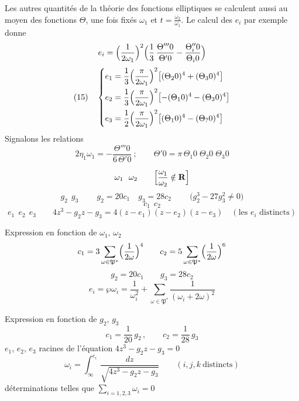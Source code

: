 \documentclass[11pt,a4paper]{article}
\begin{document}
Les autres quantités de la théorie des fonctions elliptiques se calculent
aussi au moyen des fonctions $\Theta$, une fois fixés $\omega_1$ et
$t = \frac{\omega_2}{\omega_1}$. Le calcul des $e_i$ par exemple donne
\[
e_i = \Bigl(\frac{1}{2\omega_1}\Bigr)^2\Bigl(\frac{1}{3}\,\frac{\Theta'''0}{\Theta'0}
- \frac{\Theta''_i 0}{\Theta_i 0}\Bigr)
\]
\ill{} \ill{}
\[
(15)\quad \left\lbrace
\begin{aligned}
e_1 &= \frac13\Bigl(\frac{\pi}{2\omega_1}\Bigr)^2\bigl[(\Theta_2 0)^4 + (\Theta_3 0)^4\bigr]\\
e_2 &= \frac13\Bigl(\frac{\pi}{2\omega_1}\Bigr)^2\bigl[-(\Theta_1 0)^4 - (\Theta_3 0)^4\bigr]\\
e_3 &= \frac12\Bigl(\frac{\pi}{2\omega_1}\Bigr)^2\bigl[(\Theta_1 0)^4 - (\Theta_? 0)^4\bigr]
\end{aligned}
\right.
\]
Signalons les relations
\[
2\eta_1\omega_1 = -\frac{\Theta'''0}{6\,\Theta'0}\ ; \qquad
\Theta'0 = \pi\,\Theta_1 0\;\Theta_2 0\;\Theta_3 0
\]

\[
\omega_1\ \ \omega_2 \qquad \Bigl[\frac{\omega_1}{\omega_2}\notin\mathbf{R}\Bigr]
\]
\[
g_2\ \ g_3 \qquad \boxed{\ g_2 = 20c_1 \quad g_3 = 28c_2\ } \qquad
\bigl(g_2^3 - 27g_3^2 \neq 0\bigr)
\]
\[
c_1\ \ c_2
\]
\[
e_1\ \ e_2\ \ e_3 \qquad 4z^3 - g_2 z - g_3 = 4(z-e_1)(z-e_2)(z-e_3)
\quad (\text{les } e_i \text{ distincts})
\]

Expression en fonction de $\omega_1$, $\omega_2$
\[
c_1 = 3\sum_{\omega\in\mathfrak{P}^*}\Bigl(\frac{1}{2\omega}\Bigr)^4 \qquad
c_2 = 5\sum_{\omega\in\mathfrak{P}^*}\Bigl(\frac{1}{2\omega}\Bigr)^6
\]
\[
g_2 = 20c_1 \qquad g_3 = 28c_2
\]
\[
e_i = \wp\omega_i = \frac{1}{\omega_i^2} + \sum_{\omega\in\mathfrak{P}^*}
\frac{1}{(\omega_i + 2\omega)^2}
\]

Expression en fonction de $g_2$, $g_3$ 
\[
c_1 = \frac{1}{20}\,g_2\,, \qquad c_2 = \frac{1}{28}\,g_3
\]
$e_1$, $e_2$, $e_3$ racines de l'équation $4z^3 - g_2 z - g_3 = 0$
\[
\omega_i = \int_\infty^{e_i}\frac{dz}{\sqrt{4z^3 - g_2 z - g_3}}
\qquad (i,j,k\ \text{distincts})
\]
déterminations telles que $\sum_{i=1,2,3}\omega_i = 0$
\end{document}
